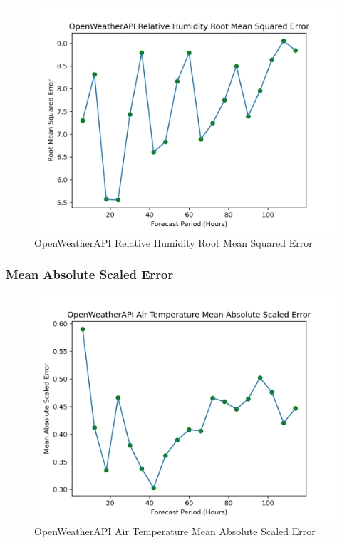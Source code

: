 \begin{appendices}
    \begin{figure}[H]
        \centering
        \includegraphics[width=.7\linewidth]{Graphs/accuracy/appendices/openweatherapi/relative_humidity/root_mean_squared_error.png}
        \caption{OpenWeatherAPI Relative Humidity Root Mean Squared Error}
    \end{figure}
    
    \subsubsection{Mean Absolute Scaled Error}
    \begin{figure}[H]
        \centering
        \includegraphics[width=.7\linewidth]{Graphs/accuracy/appendices/openweatherapi/air_temperature/mean_absolute_scaled_error.png}
        \caption{OpenWeatherAPI Air Temperature Mean Absolute Scaled Error}
    \end{figure}
    

\end{appendices}
